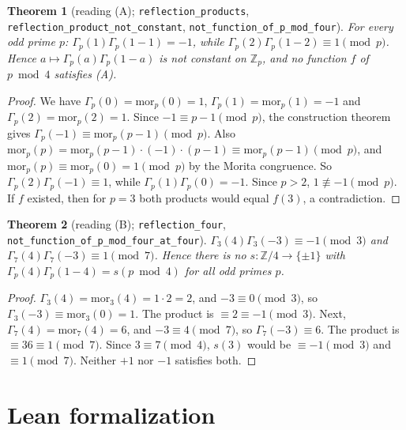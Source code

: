 \documentclass[11pt]{article}
\newtheorem{theorem}{Theorem}
\theoremstyle{definition}
\newcommand{\Zp}{\mathbb{Z}_p}
\begin{document}
\begin{theorem}[reading (A); \texttt{reflection\_products}, \texttt{reflection\_product\_not\_constant},
\texttt{not\_function\_of\_p\_mod\_four}]
For every odd prime $p$: $\Gamma_p(1)\Gamma_p(1-1) = -1$, while
$\Gamma_p(2)\Gamma_p(1-2) \equiv 1 \pmod p$. Hence $a \mapsto \Gamma_p(a)\Gamma_p(1-a)$ is not constant
on $\Zp$, and no function $f$ of $p \bmod 4$ satisfies (A).
\end{theorem}
\begin{proof}
We have $\Gamma_p(0) = \mathrm{mor}_p(0) = 1$, $\Gamma_p(1) = \mathrm{mor}_p(1) = -1$ and
$\Gamma_p(2) = \mathrm{mor}_p(2) = 1$. Since $-1 \equiv p-1 \pmod p$, the construction theorem gives
$\Gamma_p(-1) \equiv \mathrm{mor}_p(p-1) \pmod p$. Also
$\mathrm{mor}_p(p) = \mathrm{mor}_p(p-1)\cdot(-1)\cdot(p-1) \equiv \mathrm{mor}_p(p-1) \pmod p$, and
$\mathrm{mor}_p(p) \equiv \mathrm{mor}_p(0) = 1 \pmod p$ by the Morita congruence. So
$\Gamma_p(2)\Gamma_p(-1) \equiv 1$, while $\Gamma_p(1)\Gamma_p(0) = -1$. Since $p > 2$, $1 \not\equiv -1 \pmod p$.
If $f$ existed, then for $p = 3$ both products would equal $f(3)$, a contradiction.
\end{proof}

\begin{theorem}[reading (B); \texttt{reflection\_four}, \texttt{not\_function\_of\_p\_mod\_four\_at\_four}]
$\Gamma_3(4)\Gamma_3(-3) \equiv -1 \pmod 3$ and $\Gamma_7(4)\Gamma_7(-3) \equiv 1 \pmod 7$. Hence there is no
$s : \mathbb{Z}/4 \to \{\pm1\}$ with $\Gamma_p(4)\Gamma_p(1-4) = s(p \bmod 4)$ for all odd primes $p$.
\end{theorem}
\begin{proof}
$\Gamma_3(4) = \mathrm{mor}_3(4) = 1\cdot 2 = 2$, and $-3 \equiv 0 \pmod 3$, so $\Gamma_3(-3) \equiv \mathrm{mor}_3(0) = 1$.
The product is $\equiv 2 \equiv -1 \pmod 3$. Next, $\Gamma_7(4) = \mathrm{mor}_7(4) = 6$, and $-3 \equiv 4 \pmod 7$,
so $\Gamma_7(-3) \equiv 6$. The product is $\equiv 36 \equiv 1 \pmod 7$. Since $3 \equiv 7 \pmod 4$,
$s(3)$ would be $\equiv -1 \pmod 3$ and $\equiv 1 \pmod 7$. Neither $+1$ nor $-1$ satisfies both.
\end{proof}

\section{Lean formalization}
\end{document}
